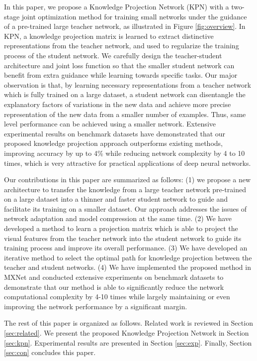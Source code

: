 \documentclass[journal]{IEEEtran}
\begin{document}
In this paper, we propose a Knowledge Projection Network (KPN) with a two-stage joint optimization method for training small networks under the guidance of a pre-trained large teacher network, as illustrated in Figure \ref{fig:overview}. In KPN, a knowledge projection matrix is learned to extract distinctive representations from the teacher network, and used to regularize the training process of the student network. We carefully design the teacher-student architecture and joint loss function so that the smaller student network can benefit from extra guidance while learning towards specific tasks. Our major observation is that, by learning  necessary representations from a teacher network which is fully trained on a large dataset, a student network can disentangle the explanatory factors of variations in the new data and achieve more precise representation of the new data from a smaller number of examples. Thus, same level performance can be achieved using a smaller network. 
Extensive experimental results on benchmark datasets have demonstrated that our proposed knowledge projection approach outperforms existing methods, improving accuracy by up to 4\% while reducing network complexity by 4 to 10 times, which is very attractive for practical applications of deep neural networks.



Our contributions in this paper are summarized as follows:
(1) we propose a new architecture to transfer the knowledge from a large  teacher network pre-trained on a large dataset into a thinner and faster student network to guide and facilitate its training on a smaller dataset. Our approach addresses the issues of network adaptation and model compression at the same time. 
(2) We have developed a method to learn a projection matrix which is able to project the visual features from the teacher network into the student network to guide its training process and improve its overall performance.  
(3) We have developed an iterative method to select the optimal path for knowledge projection between the teacher and student networks. 
(4) We have implemented the proposed method in MXNet  and conducted extensive experiments on benchmark datasets to demonstrate that our method is able to significantly reduce the network computational complexity by 4-10 times while largely maintaining or even improving the network performance by a significant margin. 

The rest of this paper is organized as follows. Related work is reviewed in Section \ref{sec:related}. We present the proposed Knowledge Projection Network in Section \ref{sec:kpn}. Experimental results are presented in Section \ref{sec:exp}. Finally, Section \ref{sec:con} concludes this paper.
\end{document}
